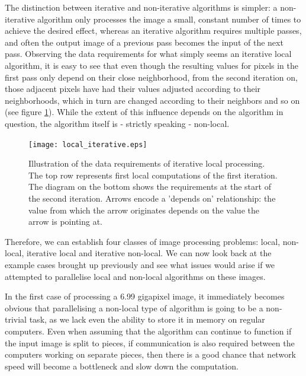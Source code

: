 \documentclass [12pt,a4paper]{report}
\begin{document}
The distinction between iterative and non-iterative algorithms is simpler: a non-iterative algorithm only processes the image a small, constant number of times to achieve the desired effect, whereas an iterative algorithm requires multiple passes, and often the output image of a previous pass becomes the input of the next pass. Observing the data requirements for what simply seems an iterative local algorithm, it is easy to see that even though the resulting values for pixels in the first pass only depend on their close neighborhood, from the second iteration on, those adjacent pixels have had their values adjusted according to their neighborhoods, which in turn are changed according to their neighbors and so on (see figure \ref{fig_local_iterative}). While the extent of this influence depends on the algorithm in question, the algorithm itself is - strictly speaking - non-local.

\begin{figure}[h]
\begin{center}
\texttt{[image: local\_iterative.eps]} %
\caption{Illustration of the data requirements of iterative local processing. The top row represents first local computations of the first iteration. The diagram on the bottom shows the requirements at the start of the second iteration. Arrows encode a 'depends on' relationship: the value from which the arrow originates depends on the value the arrow is pointing at.}
\label{fig_local_iterative}
\end{center}
\end{figure}

Therefore, we can establish four classes of image processing problems: local, non-local, iterative local and iterative non-local. We can now look back at the example cases brought up previously and see what issues would arise if we attempted to parallelise local and non-local algorithms on these images.

In the first case of processing a 6.99 gigapixel image, it immediately becomes obvious that parallelising a non-local type of algorithm is going to be a non-trivial task, as we lack even the ability to store it in memory on regular computers. Even when assuming that the algorithm can continue to function if the input image is split to pieces, if communication is also required between the computers working on separate pieces, then there is a good chance that network speed will become a bottleneck and slow down the computation.
\end{document}
